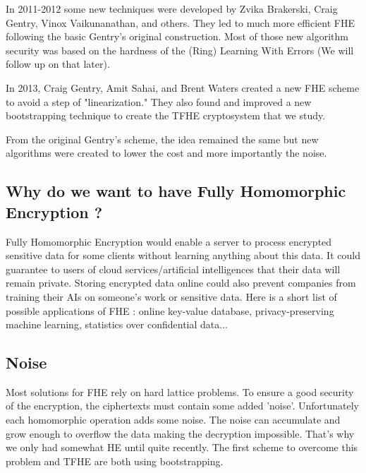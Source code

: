 \documentclass{article}
\theoremstyle{definition}
\theoremstyle{Theorem}
\begin{document}
In 2011-2012 some new techniques were developed by Zvika Brakerski, Craig Gentry, Vinox Vaikunanathan, and others. They led to much more efficient FHE following the basic Gentry's original construction. Most of those new algorithm security was based on the hardness of the (Ring) Learning With Errors (We will follow up on that later). 

In 2013, Craig Gentry, Amit Sahai, and Brent Waters created a new FHE scheme to avoid a step of "linearization." They also found and improved a new bootstrapping technique to create the TFHE cryptosystem that we study.

From the original Gentry's scheme, the idea remained the same but new algorithms were created to lower the cost and more importantly the noise.

\subsection{Why do we want to have Fully Homomorphic Encryption ?}

Fully Homomorphic Encryption would enable a server to process encrypted sensitive data for some clients without learning anything about this data. It could guarantee to users of cloud services/artificial intelligences that their data will remain private. Storing encrypted data online could also prevent companies from training their AIs on someone's work or sensitive data. Here is a short list of possible applications of FHE : online key-value database, privacy-preserving machine learning, statistics over confidential data...

\subsection{Noise}\label{noise}

Most solutions for FHE rely on hard lattice problems. To ensure a good security of the encryption, the ciphertexts must contain some added 'noise'. Unfortunately each homomorphic 
operation adds some noise. The noise can accumulate and grow enough to overflow the data making the decryption impossible. That's why we only had somewhat HE until quite recently. The first scheme to overcome this problem and TFHE are both using bootstrapping.

\end{document}
